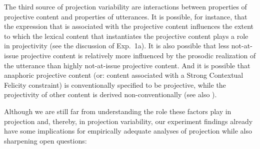 \documentclass[11pt,fleqn]{article}
\newcommand{\6}{\mbox{$[\hspace*{-.6mm}[$}}
\newcommand{\9}{\mbox{$]\hspace*{-.6mm}]$}}
\begin{document}
The third source of projection variability are interactions between properties of projective content and properties of utterances. It is possible, for instance, that the expression that is associated with the projective content influences the extent to which the lexical content that instantiates the projective content plays a role in projectivity (see the discussion of Exp.~1a). It is also possible that less not-at-issue projective content is relatively more influenced by the prosodic realization of the utterance than highly not-at-issue projective content. And it is possible that anaphoric projective content (or: content associated with a Strong Contextual Felicity constraint) is conventionally specified to be projective, while the projectivity of other content is derived non-conventionally (see also \citealt{brst-ar}).

Although we are still far from understanding the role these factors play in projection and, thereby, in projection variability, our experiment findings already have some implications for empirically adequate analyses of projection while also sharpening open questions:
\end{document}
